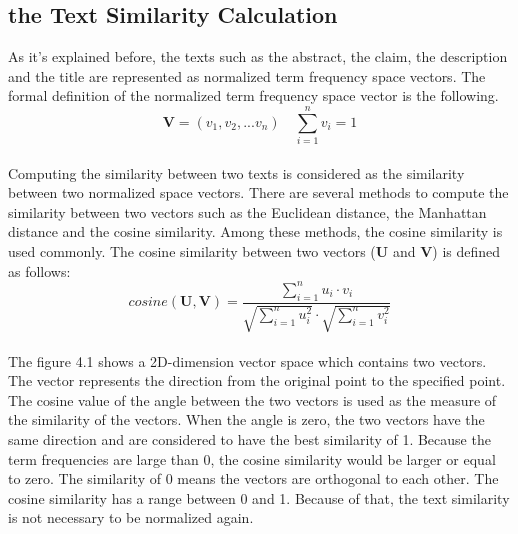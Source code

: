 \subsection{the Text Similarity Calculation}
As it's explained before, the texts such as the abstract, the claim, the description and  the title are represented as normalized term frequency space vectors. The formal definition of the normalized term frequency space vector is the following.
\\
\begin{equation}
\textbf{V}=(v_1,v_2,...v_n) \quad  \sum_{i=1}^n v_i =1
\end{equation}
\\
Computing the similarity between two texts is considered as the similarity between two normalized space vectors. There are several methods to compute the similarity between two vectors such as the Euclidean distance, the Manhattan distance and the cosine similarity. Among these methods, the cosine similarity is used commonly. The cosine similarity between two vectors ($\textbf{U}$ and $\textbf{V}$) is defined as follows:
\\
\begin{equation}
cosine(\textbf{U},\textbf{V})= \frac{\sum_{i=1}^n u_i \cdot v_i}{\sqrt{\sum_{i=1}^n u_i^2} \cdot \sqrt{\sum_{i=1}^n v_i^2}}
\end{equation} 
\\
The figure 4.1 shows a 2D-dimension vector space which contains two vectors. The vector represents the direction from the original point to the specified point. The cosine value of the angle between the two vectors is used as the measure of the similarity of the vectors. When the angle is zero, the two vectors have the same direction and are considered to have the best similarity of 1. Because the term frequencies are large than 0, the cosine similarity would be larger or equal to zero. The similarity of 0 means the vectors are orthogonal to each other. The cosine similarity has a range between 0 and 1. Because of that, the text similarity is not necessary to be normalized again.
\vspace{6pt}
